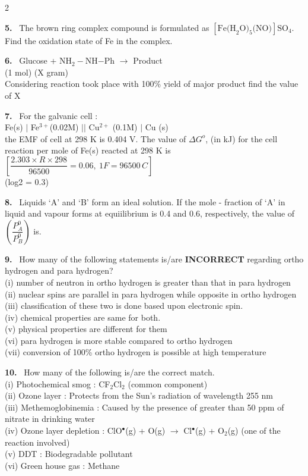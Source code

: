 \documentclass[10pt]{extarticle}
\newcommand{\qn}[1]{\par\smallskip\noindent\textbf{#1.}~}
\begin{document}
\begin{multicols}{2}
\qn{5} The brown ring complex compound is formulated as $[\text{Fe(H}_2\text{O)}_5\text{(NO)}]\text{SO}_4$. Find the oxidation state of Fe in the complex.

\qn{6} Glucose + NH$_2-$NH$-$Ph $\longrightarrow$ Product\\
(1 mol) \hspace{1cm} (X gram)\\
Considering reaction took place with 100\% yield of major product find the value of X

\qn{7} For the galvanic cell :\\
Fe(s) $|$ Fe$^{3+}$(0.02M) $||$ Cu$^{2+}$ (0.1M) $|$ Cu (s)\\
the EMF of cell at 298 K is 0.404 V. The value of $\Delta G^o$, (in kJ) for the cell reaction per mole of Fe(s) reacted at 298 K is\\
$\left[\dfrac{2.303\times R\times298}{96500}=0.06,\ 1F=96500\,C\right]$\\
(log2 = 0.3)

\qn{8} Liquids `A' and `B' form an ideal solution. If the mole - fraction of `A' in liquid and vapour forms at equiilibrium is 0.4 and 0.6, respectively, the value of $\left(\dfrac{P_A^0}{P_B^0}\right)$ is.

\qn{9} How many of the following statements is/are \textbf{INCORRECT} regarding ortho hydrogen and para hydrogen?\\
(i) number of neutron in ortho hydrogen is greater than that in para hydrogen\\
(ii) nuclear spins are parallel in para hydrogen while opposite in ortho hydrogen\\
(iii) classification of these two is done based upon electronic spin.\\
(iv) chemical properties are same for both.\\
(v) physical properties are different for them\\
(vi) para hydrogen is more stable compared to ortho hydrogen\\
(vii) conversion of 100\% ortho hydrogen is possible at high temperature

\qn{10} How many of the following is/are the correct match.\\
(i) Photochemical smog : CF$_2$Cl$_2$ (common component)\\
(ii) Ozone layer : Protects from the Sun's radiation of wavelength 255 nm\\
(iii) Methemoglobinemia : Caused by the presence of greater than 50 ppm of nitrate in drinking water\\
(iv) Ozone layer depletion : ClO$^\bullet$(g) + O(g) $\rightarrow$ Cl$^\bullet$(g) + O$_2$(g) (one of the reaction involved)\\
(v) DDT : Biodegradable pollutant\\
(vi) Green house gas : Methane


\end{multicols}
\end{document}

